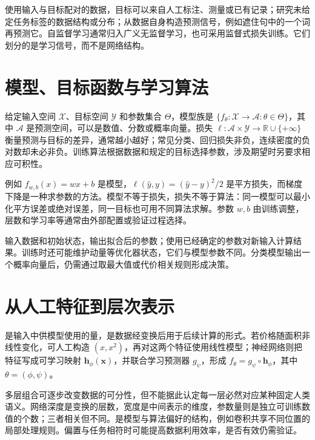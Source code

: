 \documentclass[UTF8,12pt,a4paper,fontset=fandol]{ctexbook}
\begin{document}
使用输入与目标配对的数据，目标可以来自人工标注、测量或已有记录；研究未给定任务标签的数据结构或分布；从数据自身构造预测信号，例如遮住句中的一个词再预测它。自监督学习通常归入广义无监督学习，也可采用监督式损失训练。它们划分的是学习信号，而不是网络结构。

\section{模型、目标函数与学习算法}
\begin{definition}[模型与学习问题]
给定输入空间 $\mathcal X$、目标空间 $\mathcal Y$ 和参数集合 $\Theta$，模型族是 $\{f_\theta:\mathcal X\to\mathcal A:\theta\in\Theta\}$，其中 $\mathcal A$ 是预测空间，可以是数值、分数或概率向量。损失 $\ell:\mathcal A\times\mathcal Y\to\mathbb R\cup\{+\infty\}$ 衡量预测与目标的差异，通常越小越好；常见分类、回归损失非负，连续密度的负对数却未必非负。训练算法根据数据和规定的目标选择参数，涉及期望时另要求相应可积性。
\end{definition}
例如 $f_{w,b}(x)=wx+b$ 是模型，$\ell(\widehat y,y)=(\widehat y-y)^2/2$ 是平方损失，而梯度下降是一种求参数的方法。模型不等于损失，损失不等于算法：同一模型可以最小化平方误差或绝对误差，同一目标也可用不同算法求解。参数 $w,b$ 由训练调整，层数和学习率等通常由外部配置或验证过程选择。

输入数据和初始状态，输出拟合后的参数；使用已经确定的参数对新输入计算结果。训练时还可能维护动量等优化器状态，它们与模型参数不同。分类模型输出一个概率向量后，仍需通过取最大值或代价相关规则形成决策。

\section{从人工特征到层次表示}
是输入中供模型使用的量，是数据经变换后用于后续计算的形式。若价格随面积非线性变化，可人工构造 $(x,x^2)$，再对这两个特征使用线性模型；神经网络则把特征写成可学习映射 $\mathbf h_\phi(\mathbf x)$，并联合学习预测器 $g_\psi$，形成 $f_\theta=g_\psi\circ\mathbf h_\phi$，其中 $\theta=(\phi,\psi)$。

多层组合可逐步改变数据的可分性，但不能据此认定每一层必然对应某种固定人类语义。网络深度是变换的层数，宽度是中间表示的维度，参数量则是独立可训练数值的个数；三者相关但不同。是模型与算法偏好的结构，例如卷积共享不同位置的局部处理规则。偏置与任务相符时可能提高数据利用效率，是否有效仍需验证。
\end{document}
